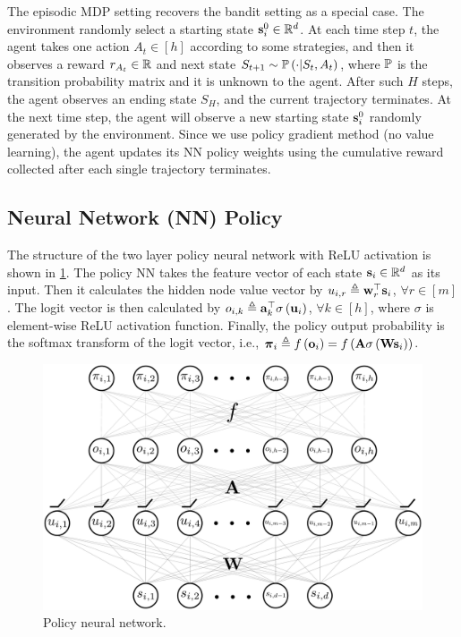 The episodic MDP setting recovers the bandit setting as a special case. The environment randomly select a starting state ${\mathbf{s}}_i^0 \in {\mathbb{R}}^d$. At each time step $t$, the agent takes one action $A_t \in [h]$ according to some strategies, and then it observes a reward $r_{A_t} \in {\mathbb{R}}$ and next state $S_{t+1} \sim {\mathbb{P}}\left( \cdot \middle| S_t, A_t \right)$, where ${\mathbb{P}}$ is the transition probability matrix and it is unknown to the agent. After such $H$ steps, the agent observes an ending state $S_H$, and the current trajectory terminates. At the next time step, the agent will observe a new starting state ${\mathbf{s}}_i^0$ randomly generated by the environment. Since we use policy gradient method (no value learning), the agent updates its NN policy weights using the cumulative reward collected after each single trajectory terminates.

\subsection{Neural Network (NN) Policy}
\label{subsec:nn_policy}

The structure of the two layer policy neural network with ReLU activation is shown in \cref{fig:nn_policy}. The policy NN takes the feature vector of each state ${\mathbf{s}}_i \in {\mathbb{R}}^d$ as its input. Then it calculates the hidden node value vector by $u_{i,r} \triangleq {\mathbf{w}}_r^\top {\mathbf{s}}_i$, $\forall r \in [m]$. The logit vector is then calculated by $o_{i,k} \triangleq {\mathbf{a}}_k^\top \sigma\left( {\mathbf{u}}_i \right)$, $\forall k \in [h]$, where $\sigma$ is element-wise ReLU activation function. Finally, the policy output probability is the softmax transform of the logit vector, i.e., ${\boldsymbol{\pi}}_i \triangleq f\left( {\mathbf{o}}_i \right) = f\left( {\mathbf{A}} \sigma\left( {\mathbf{W}} {\mathbf{s}}_i \right) \right)$. 
\begin{figure}[t]
\vskip 0.2in
\begin{center}
\centerline{\includegraphics[width=\columnwidth]{nn_policy.pdf}}
\caption{Policy neural network.}
\label{fig:nn_policy}
\end{center}
\vskip -0.2in
\end{figure}

